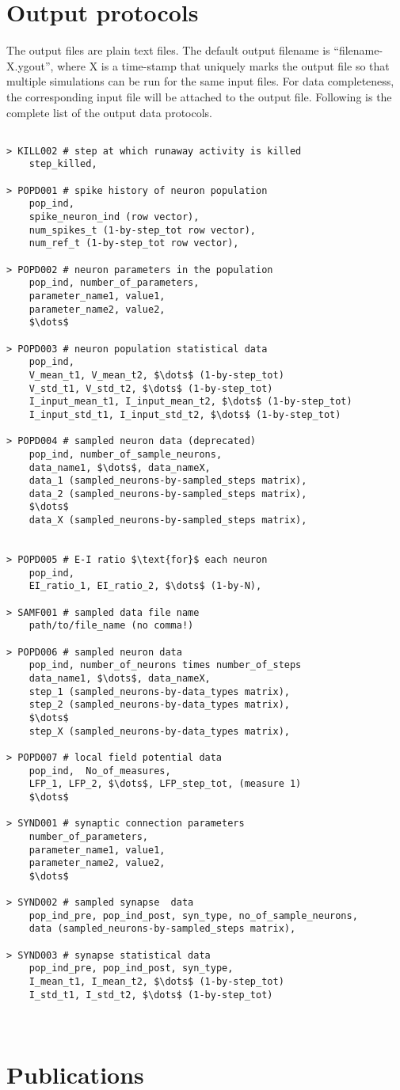 \documentclass{article}
\begin{document}
\section{Output protocols}
\label{sec:Output protocols}
The output files are plain text files.
The default output filename is ``filename-X.ygout'', where X is a time-stamp that uniquely marks the output file so that multiple simulations can be run for the same input files.
For data completeness, the corresponding input file will be attached to the output file.
Following is the complete list of the output data protocols.
\begin{lstlisting}[mathescape]

> KILL002 # step at which runaway activity is killed
	step_killed,

> POPD001 # spike history of neuron population
	pop_ind,
	spike_neuron_ind (row vector),
	num_spikes_t (1-by-step_tot row vector),
	num_ref_t (1-by-step_tot row vector),

> POPD002 # neuron parameters in the population
	pop_ind, number_of_parameters,
	parameter_name1, value1,
	parameter_name2, value2,
	$\dots$

> POPD003 # neuron population statistical data
	pop_ind,
	V_mean_t1, V_mean_t2, $\dots$ (1-by-step_tot)
	V_std_t1, V_std_t2, $\dots$ (1-by-step_tot)
	I_input_mean_t1, I_input_mean_t2, $\dots$ (1-by-step_tot)
	I_input_std_t1, I_input_std_t2, $\dots$ (1-by-step_tot)
	
> POPD004 # sampled neuron data (deprecated)
	pop_ind, number_of_sample_neurons,
	data_name1, $\dots$, data_nameX,
	data_1 (sampled_neurons-by-sampled_steps matrix),
	data_2 (sampled_neurons-by-sampled_steps matrix),
	$\dots$
	data_X (sampled_neurons-by-sampled_steps matrix),


> POPD005 # E-I ratio $\text{for}$ each neuron
	pop_ind,
	EI_ratio_1, EI_ratio_2, $\dots$ (1-by-N),
	
> SAMF001 # sampled data file name
	path/to/file_name (no comma!)

> POPD006 # sampled neuron data
	pop_ind, number_of_neurons times number_of_steps
	data_name1, $\dots$, data_nameX,
	step_1 (sampled_neurons-by-data_types matrix),
	step_2 (sampled_neurons-by-data_types matrix),
	$\dots$
	step_X (sampled_neurons-by-data_types matrix),
	
> POPD007 # local field potential data
	pop_ind,  No_of_measures, 
	LFP_1, LFP_2, $\dots$, LFP_step_tot, (measure 1)
	$\dots$ 
	
> SYND001 # synaptic connection parameters
	number_of_parameters,
	parameter_name1, value1,
	parameter_name2, value2,
	$\dots$

> SYND002 # sampled synapse  data
	pop_ind_pre, pop_ind_post, syn_type, no_of_sample_neurons,
	data (sampled_neurons-by-sampled_steps matrix),

> SYND003 # synapse statistical data
	pop_ind_pre, pop_ind_post, syn_type,
	I_mean_t1, I_mean_t2, $\dots$ (1-by-step_tot)
	I_std_t1, I_std_t2, $\dots$ (1-by-step_tot)
	
	

\end{lstlisting}

\section{Publications }


{}

\end{document}
